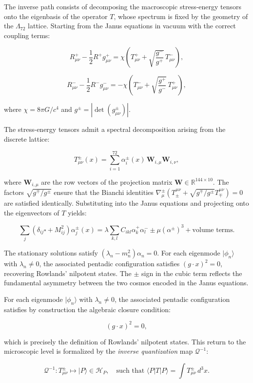 \documentclass[11pt]{article}
\let\oldmathcal\mathcal
\renewcommand{\mathcal}[1]{\oldmathcal{#1}}
\let\Box\square
\providecommand{\Box}{\square}
\begin{document}
The inverse path consists of decomposing the macroscopic stress-energy
tensors onto the eigenbasis of the operator \(T\), whose spectrum is
fixed by the geometry of the \(\Lambda_{72}\) lattice. Starting from the
Janus equations in vacuum with the correct coupling terms:

\[
R_{\mu\nu}^+ - \frac{1}{2}R^+ g_{\mu\nu}^+ = \chi \left( T_{\mu\nu}^+ + \sqrt{\frac{g^-}{g^+}} \, T_{\mu\nu}^- \right),
\]

\[
R_{\mu\nu}^- - \frac{1}{2}R^- g_{\mu\nu}^- = -\chi \left( T_{\mu\nu}^- + \sqrt{\frac{g^+}{g^-}} \, T_{\mu\nu}^+ \right),
\]

where \(\chi = 8\pi G/c^4\) and \(g^\pm = |\det(g_{\mu\nu}^\pm)|\).

The stress-energy tensors admit a spectral decomposition arising from
the discrete lattice:

\[
T_{\mu\nu}^\pm(x) = \sum_{i=1}^{72} \alpha_i^\pm(x) \, \mathbf{W}_{i,\mu} \mathbf{W}_{i,\nu},
\]

where \(\mathbf{W}_{i,\mu}\) are the row vectors of the projection
matrix \(\mathbf{W} \in \mathbb{R}^{144 \times 10}\). The factors
\(\sqrt{g^\mp/g^\pm}\) ensure that the Bianchi identities
\(\nabla_\mu^\pm (T^{\mu\nu}_\pm + \sqrt{g^\mp/g^\pm} T^{\mu\nu}_\mp) = 0\)
are satisfied identically. Substituting into the Janus equations and
projecting onto the eigenvectors of \(T\) yields:

\[
\sum_j \left( \delta_{ij} \Box + M_{ij}^2 \right) \alpha_j^\pm(x) = \lambda \sum_{k,l} C_{ikl} \alpha_k^+ \alpha_l^- \pm \mu (\alpha^\pm)^3 + \text{volume terms}.
\]

The stationary solutions satisfy \((\lambda_n - m_n^2)\alpha_n = 0\).
For each eigenmode \(|\phi_n\rangle\) with \(\lambda_n \neq 0\), the
associated pentadic configuration satisfies \((g\cdot x)^2 = 0\),
recovering Rowlands' nilpotent states. The \(\pm\) sign in the cubic
term reflects the fundamental asymmetry between the two cosmos encoded
in the Janus equations.

For each eigenmode \(|\phi_n\rangle\) with \(\lambda_n \neq 0\), the
associated pentadic configuration satisfies by construction the
algebraic closure condition:

\[
(g \cdot x)^2 = 0,
\]

which is precisely the definition of Rowlands' nilpotent states. This
return to the microscopic level is formalized by the \emph{inverse
quantization} map \(\mathcal{Q}^{-1}\):

\[
\mathcal{Q}^{-1} : T_{\mu\nu}^\pm \mapsto |P\rangle \in \mathcal{H}_P, \quad \text{such that } \langle P | T | P \rangle = \int T_{\mu\nu}^\pm \, d^3x.
\]
\end{document}
